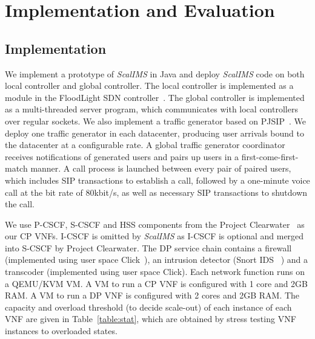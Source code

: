 \section{Implementation and Evaluation} \label{Evaluation}

\subsection{Implementation}

We implement a prototype of \textit{ScalIMS} in Java and deploy \textit{ScalIMS} code on both local controller and global controller. The local controller is implemented as a module in the FloodLight SDN controller~\cite{floodlight}. The global controller is implemented as a multi-threaded server program, which communicates with local controllers over regular sockets.  We also implement a traffic generator based on PJSIP~\cite{pjsip}. We deploy one traffic generator in each datacenter, producing user arrivals bound to the datacenter at a configurable rate. A global traffic generator coordinator receives notifications of generated users and pairs up users in a first-come-first-match manner. A call process is launched between every pair of paired users, which includes SIP transactions to establish a call, followed by a one-minute voice call at the bit rate of 80kbit/s, as well as necessary SIP transactions to shutdown the call.




We use P-CSCF, S-CSCF and HSS components from the Project Clearwater~\cite{project-clearwater} as our CP VNFs. I-CSCF is omitted by \textit{ScalIMS} as I-CSCF is optional and merged into S-CSCF by Project Clearwater. The DP service chain contains a firewall (implemented using user space Click~\cite{martins2014clickos}), an intrusion detector (Snort IDS ~\cite{snort}) and a transcoder (implemented using user space Click). Each network function runs on a QEMU/KVM VM. A VM to run a CP VNF is configured with 1 core and 2GB RAM. A VM to run a DP VNF is configured with 2 cores and 2GB RAM. The capacity and overload threshold (to decide scale-out) of each instance of each VNF are given in Table~\ref{table:stat}, which are obtained by stress testing VNF instances to overloaded states. %


